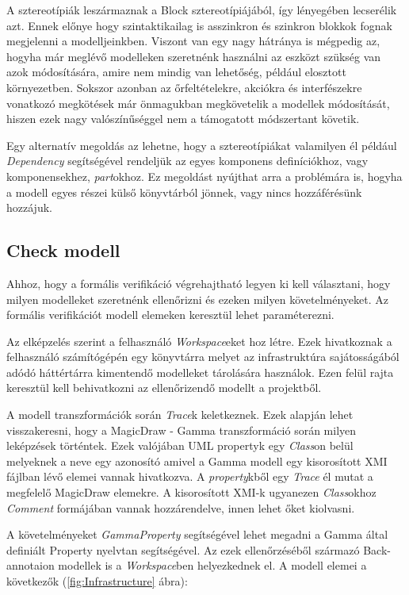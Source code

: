 A sztereotípiák leszármaznak a Block sztereotípiájából, így lényegében lecserélik azt. Ennek előnye hogy szintaktikailag is asszinkron és szinkron blokkok fognak megjelenni a modelljeinkben. Viszont van egy nagy hátránya is mégpedig az, hogyha már meglévő modelleken szeretnénk használni az eszközt szükség van azok módosítására, amire nem mindig van lehetőség, például elosztott környezetben. Sokszor azonban az őrfeltételekre, akciókra és interfészekre vonatkozó megkötések már önmagukban megkövetelik a modellek módosítását, hiszen ezek nagy valószínűséggel nem a támogatott módszertant követik.

Egy alternatív megoldás az lehetne, hogy a sztereotípiákat valamilyen él például \emph{Dependency} segítségével rendeljük az egyes komponens definíciókhoz, vagy komponensekhez, \emph{part}okhoz. Ez megoldást nyújthat arra a problémára is, hogyha a modell egyes részei külső könyvtárból jönnek, vagy nincs hozzáférésünk hozzájuk.


\subsection{Check modell}

Ahhoz, hogy a formális verifikáció végrehajtható legyen ki kell választani, hogy milyen modelleket szeretnénk ellenőrizni és ezeken milyen követelményeket. Az formális verifikációt modell elemeken keresztül lehet paraméterezni.

Az elképzelés szerint a felhasználó \emph{Workspace}eket hoz létre. Ezek hivatkoznak a felhasználó számítógépén egy könyvtárra melyet az infrastruktúra sajátosságából adódó háttértárra kimentendő modelleket tárolására használok. Ezen felül rajta keresztül kell behivatkozni az ellenőrizendő modellt a projektből.

A modell transzformációk során \emph{Trace}k keletkeznek. Ezek alapján lehet visszakeresni, hogy a MagicDraw - Gamma transzformáció során milyen leképzések történtek. Ezek valójában UML propertyk egy \emph{Class}on belül melyeknek a neve egy azonosító amivel a Gamma modell egy kisorosított XMI fájlban lévő elemei vannak hivatkozva. A \emph{property}kből egy \emph{Trace} él mutat a megfelelő MagicDraw elemekre. A kisorosított XMI-k ugyanezen \emph{Class}okhoz \emph{Comment} formájában vannak hozzárendelve, innen lehet őket kiolvasni.

A követelményeket \emph{GammaProperty} segítségével lehet megadni a Gamma által definiált Property nyelvtan segítségével. Az ezek ellenőrzéséből származó Back-annotaion modellek is a \emph{Workspace}ben helyezkednek el. A modell elemei a következők (\ref{fig:Infrastructure} ábra):

